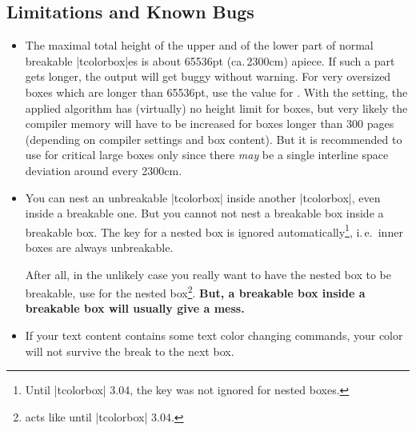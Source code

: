\subsection{Limitations and Known Bugs}
\begin{itemize}
\item  The maximal total height of the upper and of the lower part
  of normal breakable |tcolorbox|es is about 65536pt (ca.\,2300cm)
  apiece. If such a part gets longer, the output will get buggy
  without warning.
  For very oversized boxes which are longer than 65536pt, use
  the  value for  .
  With the  setting,
  the applied algorithm has (virtually) no height limit for boxes, but
  very likely the compiler memory will have to be increased for boxes longer
  than 300 pages (depending on compiler settings and box content).
  But it is recommended to use  for critical large boxes only
  since there \emph{may} be a single interline space deviation around
  every 2300cm.
\item You can nest an unbreakable |tcolorbox| inside another |tcolorbox|,
  even inside a breakable one.
  But you cannot not nest a breakable box inside a breakable box.
  The  key for a nested box is ignored
  automatically\footnote{Until |tcolorbox| 3.04, the  key
  was not ignored for nested boxes.}, i.\,e.\ inner
  boxes are always unbreakable.\par
  After all, in the unlikely case you really want to have the nested box to be breakable,
  use  for the nested
  box\footnote{  acts like  until |tcolorbox| 3.04.}.
  \textbf{But, a breakable box inside a breakable box will usually give a mess.}

\item If your text content contains some text color changing commands,
  your color will not survive the break to the next box.
\end{itemize}


\clearpage
